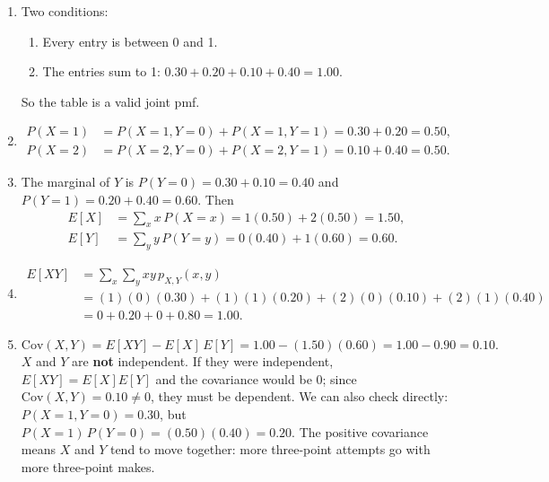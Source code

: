 \documentclass[11pt]{article}
\begin{document}
\begin{enumerate}
\item Two conditions:
  \begin{enumerate}[label=\arabic*., itemsep=2pt]
  \item Every entry is between 0 and 1. \checkmark
  \item The entries sum to 1: $0.30 + 0.20 + 0.10 + 0.40 = 1.00$. \checkmark
  \end{enumerate}
So the table is a valid joint pmf.

\item
\[
\begin{aligned}
P(X = 1) &= P(X=1, Y=0) + P(X=1, Y=1) = 0.30 + 0.20 = 0.50, \\
P(X = 2) &= P(X=2, Y=0) + P(X=2, Y=1) = 0.10 + 0.40 = 0.50.
\end{aligned}
\]

\item The marginal of $Y$ is $P(Y=0) = 0.30 + 0.10 = 0.40$ and $P(Y=1) = 0.20 + 0.40 = 0.60$. Then
\[
\begin{aligned}
E[X] &= \sum_x x\,P(X=x) = 1(0.50) + 2(0.50) = 1.50, \\
E[Y] &= \sum_y y\,P(Y=y) = 0(0.40) + 1(0.60) = 0.60.
\end{aligned}
\]

\item
\[
\begin{aligned}
E[XY] &= \sum_x \sum_y xy\,p_{X,Y}(x,y) \\
&= (1)(0)(0.30) + (1)(1)(0.20) + (2)(0)(0.10) + (2)(1)(0.40) \\
&= 0 + 0.20 + 0 + 0.80 = 1.00.
\end{aligned}
\]

\item
\[
\text{Cov}(X, Y) = E[XY] - E[X]\,E[Y] = 1.00 - (1.50)(0.60) = 1.00 - 0.90 = 0.10.
\]
$X$ and $Y$ are \textbf{not} independent. If they were independent, $E[XY] = E[X]E[Y]$ and the covariance would be 0; since $\text{Cov}(X,Y) = 0.10 \neq 0$, they must be dependent. We can also check directly: $P(X=1, Y=0) = 0.30$, but $P(X=1)\,P(Y=0) = (0.50)(0.40) = 0.20$. The positive covariance means $X$ and $Y$ tend to move together: more three-point attempts go with more three-point makes.
\end{enumerate}
\end{document}

